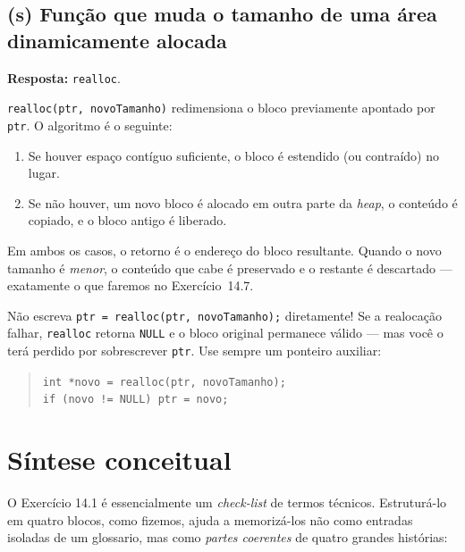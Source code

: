 \documentclass[11pt,a4paper]{article}
\begin{document}
\subsection*{(s) Fun\c{c}\~ao que muda o tamanho de uma \'area dinamicamente alocada}

\begin{resposta}\textbf{Resposta:} \texttt{realloc}.\end{resposta}

\texttt{realloc(ptr, novoTamanho)} redimensiona o bloco previamente apontado por \texttt{ptr}. O algoritmo \'e o seguinte:

\begin{enumerate}[leftmargin=*, itemsep=0pt]
  \item Se houver espa\c{c}o cont\'iguo suficiente, o bloco \'e estendido (ou contra\'ido) no lugar.
  \item Se n\~ao houver, um novo bloco \'e alocado em outra parte da \emph{heap}, o conte\'udo \'e copiado, e o bloco antigo \'e liberado.
\end{enumerate}

Em ambos os casos, o retorno \'e o endere\c{c}o do bloco resultante. Quando o novo tamanho \'e \emph{menor}, o conte\'udo que cabe \'e preservado e o restante \'e descartado --- exatamente o que faremos no Exerc\'icio~14.7.

\begin{errocomum}
N\~ao escreva \texttt{ptr = realloc(ptr, novoTamanho);} diretamente! Se a realoca\c{c}\~ao falhar, \texttt{realloc} retorna \texttt{NULL} e o bloco original permanece v\'alido --- mas voc\^e o ter\'a perdido por sobrescrever \texttt{ptr}. Use sempre um ponteiro auxiliar:
\begin{quote}
\texttt{int *novo = realloc(ptr, novoTamanho);}\\
\texttt{if (novo != NULL) ptr = novo;}
\end{quote}
\end{errocomum}

\section*{S\'intese conceitual}

O Exerc\'icio 14.1 \'e essencialmente um \emph{check-list} de termos t\'ecnicos. Estrutur\'a-lo em quatro blocos, como fizemos, ajuda a memoriz\'a-los n\~ao como entradas isoladas de um glossario, mas como \emph{partes coerentes} de quatro grandes hist\'orias:
\end{document}
